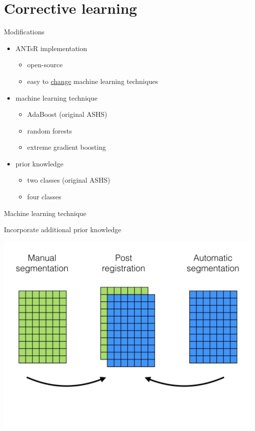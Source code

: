\documentclass[ignorenonframetext,]{beamer}
\providecommand{\tightlist}{%
  \setlength{\itemsep}{0pt}\setlength{\parskip}{0pt}}
\begin{document}
\section{Corrective learning}\label{corrective-learning}

\begin{frame}{Modifications}

\begin{itemize}
\tightlist
\item
  ANTsR implementation

  \begin{itemize}
  \tightlist
  \item
    open-source
  \item
    easy to
    \href{https://github.com/stnava/ANTsR/blob/master/R/segmentationRefinement.R\#L375-L413}{change}
    machine learning techniques
  \end{itemize}
\item
  machine learning technique

  \begin{itemize}
  \tightlist
  \item
    AdaBoost (original ASHS)
  \item
    random forests
  \item
    extreme gradient boosting
  \end{itemize}
\item
  prior knowledge

  \begin{itemize}
  \tightlist
  \item
    two classes (original ASHS)
  \item
    four classes
  \end{itemize}
\end{itemize}

\end{frame}

\begin{frame}{Machine learning technique}

\end{frame}

\begin{frame}{Incorporate additional prior knowledge}

\centering
\includegraphics[width=0.85 \textwidth]{../Figures/correctiveLearning001.png}

\end{frame}
\end{document}
